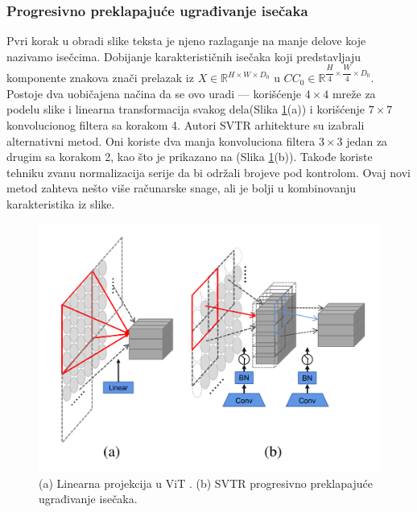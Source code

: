 \documentclass[a4paper,12pt]{article}
\begin{document}
	\subsubsection{Progresivno preklapajuće ugrađivanje isečaka}
	
	Pvri korak u obradi slike teksta je njeno razlaganje na manje delove koje nazivamo isečcima. Dobijanje karakterističnih isečaka koji predstavljaju komponente znakova znači prelazak iz \(X \in \mathbb{R}^{H \times W \times D_0}\) u \(CC_0 \in \mathbb{R}^{\dfrac{H}{4} \times \dfrac{W}{4} \times D_0}\). Postoje dva uobičajena načina da se ovo uradi — korišćenje \(4 \times 4\) mreže za podelu slike i linearna transformacija svakog dela(Slika \ref{fig:linear-projection-in-ViT}(a)) i korišćenje \(7 \times 7\) konvolucionog filtera sa korakom 4. Autori SVTR arhitekture su izabrali alternativni metod. Oni koriste dva manja konvoluciona filtera \(3 \times 3\) jedan za drugim sa korakom 2, kao što je prikazano na (Slika \ref{fig:linear-projection-in-ViT}(b)). Takođe koriste tehniku zvanu normalizacija serije da bi održali brojeve pod kontrolom. Ovaj novi metod zahteva nešto više računarske snage, ali je bolji u kombinovanju karakteristika iz slike.

	\begin{figure}[H]
		\centering
		\includegraphics[width=\textwidth]{assets/linear-projection-in-ViT.png}
		\caption{(a) Linearna projekcija u ViT \cite{dosovitskiy2021imageworth16x16words}. (b) SVTR progresivno preklapajuće ugrađivanje isečaka.}
		\label{fig:linear-projection-in-ViT}
	\end{figure}
	
\end{document}
